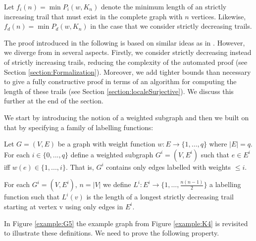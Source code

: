 \begin{isabellebody}
\begin{isamarkuptext}
Let $f_i(n) = \min P_i(w,K_n)$ denote the minimum length of an strictly increasing trail that must exist in 
the complete graph with $n$ vertices. Likewise, $f_d(n) = \min P_d(w,K_n)$ in the case that we consider 
strictly decreasing trails.%
\end{isamarkuptext}\isamarkuptrue%
%
\isadelimdocument
%
\endisadelimdocument
%
\isatagdocument
%
\isamarkuptrue%
%
\endisatagdocument
{\isafolddocument}%
%
\isadelimdocument
%
\endisadelimdocument
%
\begin{isamarkuptext}%
\label{section:symbolicProof}
The proof introduced in the following is based on similar ideas as in \cite{graham1973increasing}. 
However, we diverge from \cite{graham1973increasing} in several aspects. Firstly, we consider strictly decreasing instead of strictly increasing trails,
reducing the complexity of the automated proof (see Section \ref{section:Formalization}). 
Moreover, we add tighter bounds than necessary to give a fully constructive proof in terms of an algorithm for computing
the length of these trails (see Section \ref{section:localeSurjective}). We discuss this further at the end of the section.

We start by introducing the notion of a weighted subgraph and then we built on that by specifying a family of labelling functions:

\begin{definition} \label{def:weightedSubgraph}
	Let $G=(V,E)$ be a graph with weight function $w:E\rightarrow \{1,\ldots,q\}$ where $|E| = q$.
	For each $i\in \{0,...,q\}$ define a weighted subgraph $G^i = (V,E^i)$ such that $e\in E^i$ iff $w(e)\in \{1,...,i\}$. 
  That is, $G^i$ contains only edges labelled with weights $\le i$.
\end{definition}

\begin{definition}\label{def:Labelling}
	For each $G^i=(V,E^i)$, $n = |V|$  we define $L^i:E^i\rightarrow \{1,\ldots,\frac{n(n-1)}{2}\}$ a labelling function such 
that $L^i(v)$ is the length of a longest strictly decreasing trail starting at vertex v using only edges in $E^i$.
\end{definition}

\noindent In Figure \ref{example:G5} the example graph from Figure \ref{example:K4} is revisited to 
illustrate these definitions. We need to prove the following property.


\end{isamarkuptext}
\end{isabellebody}
